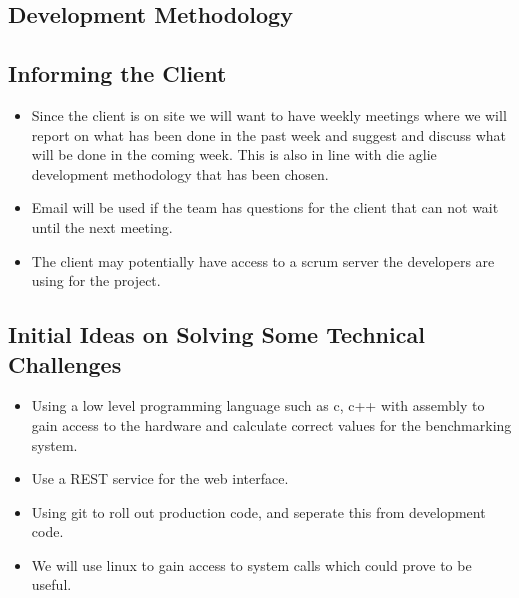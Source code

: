 \subsection{Development Methodology}


\subsection{Informing the Client}
\begin{itemize}
	\item Since the client is on site we will want to have weekly meetings where we will report on what has been done in the past week and suggest and discuss what will be done in the coming week. This is also in line with die aglie development methodology that has been chosen.
	\item Email will be used if the team has questions for the client that can not wait until the next meeting.
	\item The client may potentially have access to a scrum server the developers are using for the project.
\end{itemize}

\subsection{Initial Ideas on Solving Some Technical Challenges}
\begin{itemize}
	\item Using a low level programming language such as c, c++ with assembly to gain access to the hardware and calculate correct values for the benchmarking system.
	\item Use a REST service for the web interface.
	\item Using git to roll out production code, and seperate this from development code.
	\item We will use linux to gain access to system calls which could prove to be useful.
\end{itemize}

